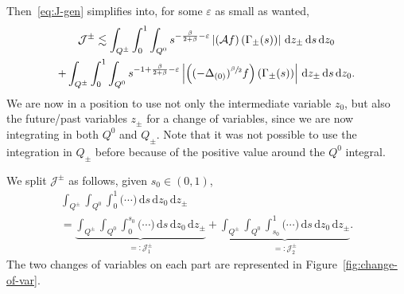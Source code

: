 \documentclass[JEP,XML,SOM,Unicode,NoFloatCountersInSection,published]{cedram}
\theoremstyle{definition}
\newcommand{\cA}{{\mathcal A}}
\newcommand{\cJ}{{\mathcal J}}
\newcommand{\dd}{{\, \mathrm d}}
\let\var\varepsilon
\begin{document}
Then~\eqref{eq:J-gen} simplifies into, for
some $\var$ as small as wanted,
\begin{multline*}
{\cJ^{\pm}} \lesssim \int_{Q^\pm} \int_0^1\int_{Q^0}
s^{-\frac{\beta}{2+\beta}-\var}
\left| \left(\cA f \right) (\Gamma_\pm(s))\right| \dd z_\pm \dd s \dd z_0 \\
+ \int_{Q^\pm} \int_0^1\int_{Q^0} s^{-1 + \frac{\beta}{2+\beta}-\var} \left|\left((-\Delta_{(0)})^{\sfrac{\beta}{2}}
f\right)\left(\Gamma_\pm(s) \right) \right| \dd z_\pm \dd s \dd z_0.
\end{multline*}
We are now in a position to use not only the intermediate
variable $z_0$, but also the future/past variables $z_\pm$ for a
change of variables, since we are now integrating in both $Q^0$
and $Q_\pm$. Note that it was not possible to use the integration
in $Q_\pm$ before because of the positive value around the $Q^0$
integral.

We split {$\cJ^{\pm}$} as follows, given $s_0 \in (0,1)$,
\begin{multline*}
\int_{Q^\pm} \int_{Q^0} \int_0^1
\big(\cdots \big) \dd s \dd z_0 \dd z_\pm
\\
= \underbrace{\int_{Q^\pm} \int_{Q^0} \int_0^{s_0} \big(\cdots \big) \dd s \dd z_0 \dd
z_\pm}_{=: \cJ^\pm_1} + \underbrace{\int_{Q^\pm}
\int_{Q^0} \int_{s_0}^1 \big(\cdots \big) \dd s \dd z_0 \dd z_\pm}_{=: \cJ^\pm_2}.
\end{multline*}
The two changes of variables on each part are represented in
Figure~\ref{fig:change-of-var}.
\end{document}
